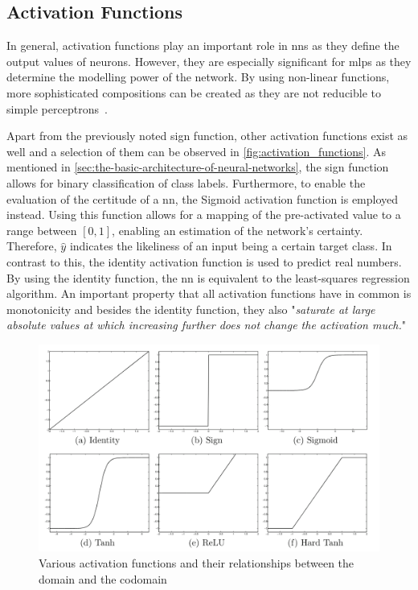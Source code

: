\documentclass[draft,final]{vutinfth} %
\newcommand{\p}[1]{see p. #1}
\begin{document}
    \subsection{Activation Functions}
    In general, activation functions play an important role in \glspl{nn} as they define the output values of neurons.
    However, they are especially significant for \glspl{mlp} as they determine the modelling power of the network.
    By using non-linear functions, more sophisticated compositions can be created as they are not reducible to simple perceptrons~\citep[\p{13}]{aggarwal_neural_2018}.

    Apart from the previously noted sign function, other activation functions exist as well and a selection of them can be observed in \autoref{fig:activation_functions}.
    As mentioned in \autoref{sec:the-basic-architecture-of-neural-networks}, the sign function allows for binary classification of class labels.
    Furthermore, to enable the evaluation of the certitude of a \gls{nn}, the Sigmoid activation function is employed instead.
    Using this function allows for a mapping of the pre-activated value to a range between $[0,1]$, enabling an estimation of the network's certainty.
    Therefore, $\hat{y}$ indicates the likeliness of an input being a certain target class.
    In contrast to this, the identity activation function is used to predict real numbers.
    By using the identity function, the \gls{nn} is equivalent to the least-squares regression algorithm.
    An important property that all activation functions have in common is monotonicity and besides the identity function, they also "\textit{saturate at large absolute values at which increasing further does not change the activation much.}"\citep[\p{13}]{aggarwal_neural_2018}

    \begin{figure}[h]
        \centering
        \includegraphics[width=\textwidth]{figures/various_activation_functions.png}
        \caption[Various activation functions and their relationships between the domain and the codomain]{Various activation functions and their relationships between the domain and the codomain\protect\footnotemark}
        \label{fig:activation_functions}
    \end{figure}
\end{document}
